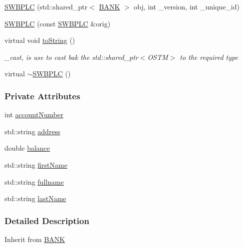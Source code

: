 \begin{DoxyCompactItemize}
\item 
\hyperlink{class_s_w_b_p_l_c_a33e460bff6f51b30209a6f5a25a24d7d_a33e460bff6f51b30209a6f5a25a24d7d}{S\+W\+B\+P\+LC} (std\+::shared\+\_\+ptr$<$ \hyperlink{class_b_a_n_k}{B\+A\+NK} $>$ obj, int \+\_\+version, int \+\_\+unique\+\_\+id)
\item 
\hyperlink{class_s_w_b_p_l_c_a767c6ae2b15f523b5ec6e35e137dcc96_a767c6ae2b15f523b5ec6e35e137dcc96}{S\+W\+B\+P\+LC} (const \hyperlink{class_s_w_b_p_l_c}{S\+W\+B\+P\+LC} \&orig)
\item 
virtual void \hyperlink{class_s_w_b_p_l_c_a761c77b5a204b4ae05ffb01bd602c3c2_a761c77b5a204b4ae05ffb01bd602c3c2}{to\+String} ()
\begin{DoxyCompactList}\small\item\em \+\_\+cast, is use to cast bak the std\+::shared\+\_\+ptr$<$\+O\+S\+T\+M$>$ to the required type \end{DoxyCompactList}\item 
virtual \hyperlink{class_s_w_b_p_l_c_a5d6f00a76145f32424ff6db9ac23c6fe_a5d6f00a76145f32424ff6db9ac23c6fe}{$\sim$\+S\+W\+B\+P\+LC} ()
\end{DoxyCompactItemize}
\subsubsection*{Private Attributes}
\begin{DoxyCompactItemize}
\item 
int \hyperlink{class_s_w_b_p_l_c_a5d03f989254b88bdb7eb3deeec7e4217_a5d03f989254b88bdb7eb3deeec7e4217}{account\+Number}
\item 
std\+::string \hyperlink{class_s_w_b_p_l_c_a86edad3cbbc5903c8ab8a45b22c0dd15_a86edad3cbbc5903c8ab8a45b22c0dd15}{address}
\item 
double \hyperlink{class_s_w_b_p_l_c_a34365efdc6dde37a4da9a6222dcde389_a34365efdc6dde37a4da9a6222dcde389}{balance}
\item 
std\+::string \hyperlink{class_s_w_b_p_l_c_a38fd4817afe4aaac4993b0b4c7074b9c_a38fd4817afe4aaac4993b0b4c7074b9c}{first\+Name}
\item 
std\+::string \hyperlink{class_s_w_b_p_l_c_a5de90ba5cac0107fa5361458a0df839e_a5de90ba5cac0107fa5361458a0df839e}{fullname}
\item 
std\+::string \hyperlink{class_s_w_b_p_l_c_aa06b2e569dd1fef8e43dfda1b34d67f3_aa06b2e569dd1fef8e43dfda1b34d67f3}{last\+Name}
\end{DoxyCompactItemize}


\subsubsection{Detailed Description}
Inherit from \hyperlink{class_b_a_n_k}{B\+A\+NK} 

